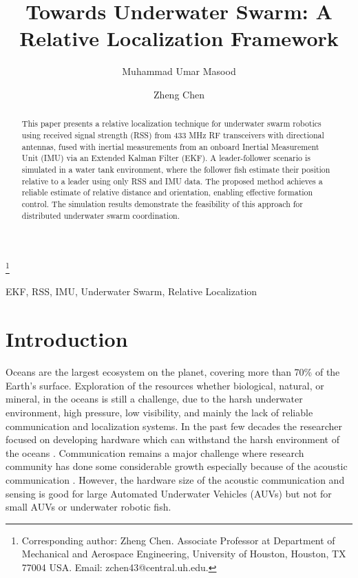 \documentclass{ifacconf}
\begin{document}
\begin{frontmatter}

\title{Towards Underwater Swarm: A Relative Localization Framework}

\thanks[footnoteinfo]{Corresponding author: Zheng Chen. Associate Professor at Department of Mechanical and Aerospace Engineering, University of Houston, Houston, TX 77004 USA. Email: zchen43@central.uh.edu.}
\author[First]{Muhammad Umar Masood} 
\author[First]{Zheng Chen} 
\address[First]{Department of Mechanical and Aerospace Engineering, University of Houston, Houston, TX 77204 USA \\
(emails:mmasood5@cougarnet.uh.edu, zchen43@central.uh.edu)}
\begin{abstract}                %
This paper presents a relative localization technique for underwater swarm robotics using received signal strength (RSS) from 433 MHz RF transceivers with directional antennas, fused with inertial measurements from an onboard Inertial Measurement Unit (IMU) via an Extended Kalman Filter (EKF). A leader-follower scenario is simulated in a water tank environment, where the follower fish estimate their position relative to a leader using only RSS and IMU data. The proposed method achieves a reliable estimate of relative distance and orientation, enabling effective formation control. The simulation results demonstrate the feasibility of this approach for distributed underwater swarm coordination.
\end{abstract}
\begin{keyword}
EKF, RSS, IMU, Underwater Swarm, Relative Localization
\end{keyword}
\end{frontmatter}
\section{Introduction}
Oceans are the largest ecosystem on the planet, covering more than 70\% of the Earth's surface. Exploration of the resources whether biological, natural, or mineral, in the oceans is still a challenge, due to the harsh underwater environment, high pressure, low visibility, and mainly the lack of reliable communication and localization systems. In the past few decades the researcher focused on developing hardware which can withstand the harsh environment of the oceans \citep{mcleod2012autonomous,Shukla2016}. Communication remains a major challenge where research community has done some considerable growth especially because of the acoustic communication \citep{Su2020,Sun2021}. However, the hardware size of the acoustic communication and sensing is good for large Automated Underwater Vehicles (AUVs) but not for small AUVs or underwater robotic fish.
\end{document}
